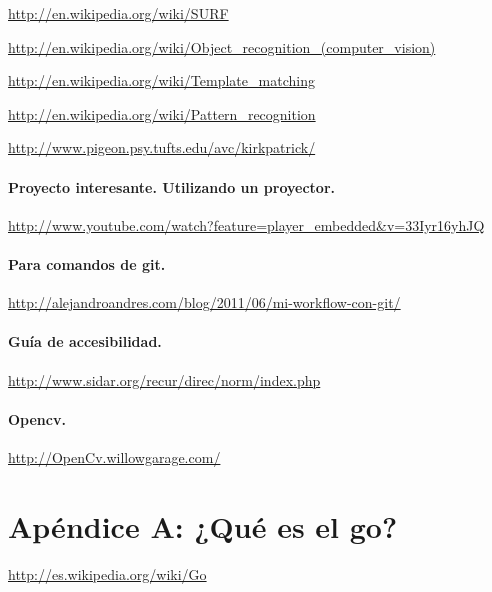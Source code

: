 \documentclass[12pt,a4papert,woside,openright,titlepage,final]{book}
\begin{document}
\url{http://en.wikipedia.org/wiki/SURF}

\url{http://en.wikipedia.org/wiki/Object_recognition_(computer_vision)}

\url{http://en.wikipedia.org/wiki/Template_matching}

\url{http://en.wikipedia.org/wiki/Pattern_recognition}

\url{http://www.pigeon.psy.tufts.edu/avc/kirkpatrick/}

\subsubsection{Proyecto interesante. Utilizando un proyector.}

\url{http://www.youtube.com/watch?feature=player_embedded&v=33Iyr16yhJQ}

\subsubsection{Para comandos de git.}
\url{http://alejandroandres.com/blog/2011/06/mi-workflow-con-git/}

\subsubsection{Guía de accesibilidad.}
\url{http://www.sidar.org/recur/direc/norm/index.php}

\subsubsection{Opencv.}
\url{http://OpenCv.willowgarage.com/}

\chapter{Apéndice A: ¿Qué es el go?} 

\url{http://es.wikipedia.org/wiki/Go}
\end{document}
